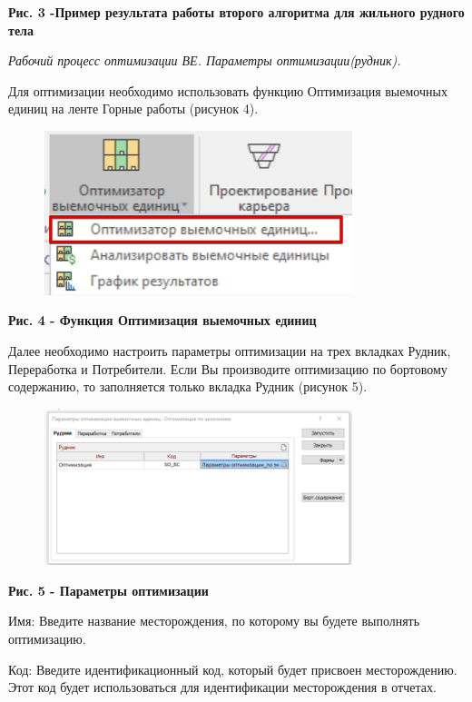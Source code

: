 {\bfseries Рис. 3 -Пример результата работы второго алгоритма для жильного
рудного тела}

\emph{Рабочий процесс оптимизации ВЕ. Параметры оптимизации(рудник).}

Для оптимизации необходимо использовать функцию Оптимизация выемочных
единиц на ленте Горные работы (рисунок 4).

\begin{figure}[H]
	\centering
	\includegraphics[width=0.8\textwidth]{assets/1253}
	\caption*{}
\end{figure}

{\bfseries Рис. 4 - Функция Оптимизация выемочных единиц}

Далее необходимо настроить параметры оптимизации на трех вкладках
Рудник, Переработка и Потребители. Если Вы производите оптимизацию по
бортовому содержанию, то заполняется только вкладка Рудник (рисунок 5).

\begin{figure}[H]
	\centering
	\includegraphics[width=0.8\textwidth]{assets/1254}
	\caption*{}
\end{figure}

{\bfseries Рис. 5 - Параметры оптимизации}

Имя: Введите название месторождения, по которому вы будете выполнять
оптимизацию.

Код: Введите идентификационный код, который будет присвоен
месторождению. Этот код будет использоваться для идентификации
месторождения в отчетах.

